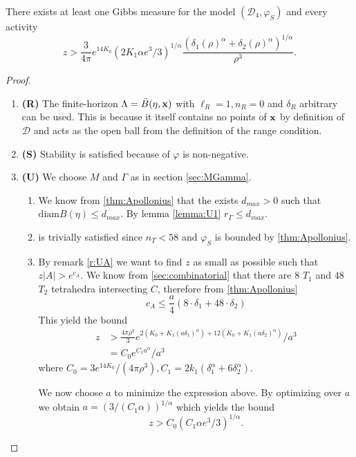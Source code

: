 \begin{theorem}\label{thm:E1}
	There exists at least one Gibbs measure for the model $(\mathcal D_4,\varphi_S)$ and every activity 
	$$z> \frac{3}{4\pi}e^{14 K_0}   (2K_1 \alpha e^3/3)^{1/\alpha} \frac{(\delta_1(\rho)^\alpha + \delta_2(\rho)^\alpha)^{1/\alpha}}{\rho^3}.$$
\end{theorem}
\begin{proof}
\begin{enumerate}[]
	\item \textbf{(R)} The finite-horizon $\Lambda = \bar B(\eta,{\mathbf{x}})$ with $\ell_R = 1, n_R = 0$ and $\delta_R$ arbitrary can be used. This is because it itself contains no points of ${\mathbf{x}}$ by definition of $\mathcal D$ and acts as the open ball from the definition of the range condition.
	\item \textbf{(S)} Stability is satisfied because of $\varphi$ is non-negative.
	\item \textbf{(U)} We choose $M$ and $\Gamma$ as in section \ref{sec:MGamma}.
		\begin{enumerate}[(U1)]
			\item We know from \ref{thm:Apollonius} that the exists $d_{max}>0$ such that $\text{diam}B(\eta)\leq d_{max}$. By lemma \ref{lemma:U1} $r_\Gamma\leq d_{max}.$
			\item is trivially satisfied since $n_T < 58$ and $\varphi_S$ is bounded by \ref{thm:Apollonius}.
			\item By remark \ref{r:UA} we want to find $z$ as small as possible such that $z|A|>e^{c_A}.$ We know from \ref{sec:combinatorial} that there are $8$ $T_1$ and $48$ $T_2$ tetrahedra intersecting $C$, therefore from \ref{thm:Apollonius}
				$$c_A \leq \frac a4 (8\cdot \delta_1 + 48\cdot \delta_2 )$$
				This yield the bound
				\begin{align*}z &> \frac{4\pi\rho^3}{3} e^{2(K_0 + K_1 (a\delta_1)^\alpha) + 12(K_0 + K_1(a \delta_2)^\alpha)} / a^3  \\
					&= C_0 e^{C_1 a^\alpha} / a^3  
				\end{align*}
				where $C_0 = 3e^{14K_0}/(4\pi \rho^3),  C_1 = 2k_1(\delta_1^\alpha + 6 \delta_2^\alpha)$.

				We now choose $a$ to minimize the expression above. By optimizing over $a$ we obtain $a=(3/(C_1 \alpha))^{1/\alpha}$ which yields the bound 
				$$z> C_0(C_1 \alpha e^3/ 3 )^{1/\alpha}.$$
		\end{enumerate}
\end{enumerate}
\end{proof}



